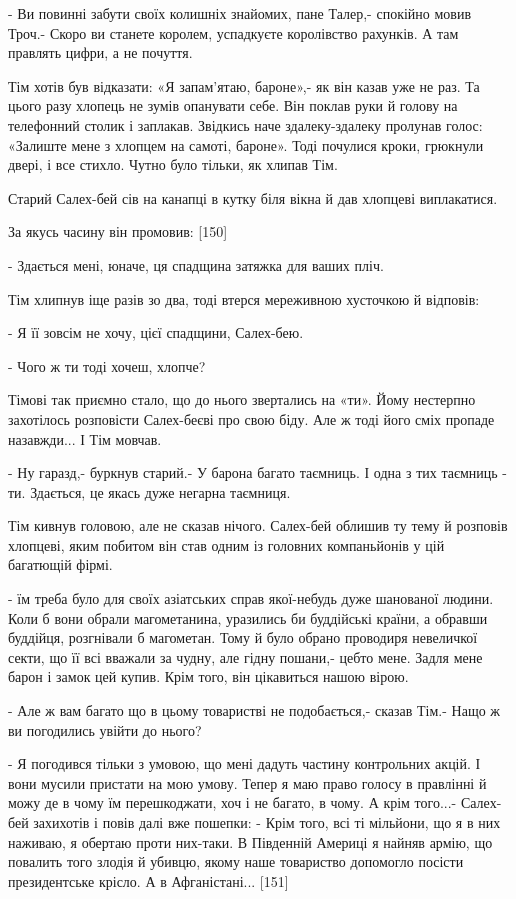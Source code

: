 - Ви повинні забути своїх колишніх знайомих, пане Талер,- спокійно мовив Троч.- Скоро ви станете королем, успадкуєте королівство рахунків. А там правлять цифри, а не почуття.

Тім хотів був відказати: «Я запам'ятаю, бароне»,- як він казав уже не раз. Та цього разу хлопець не зумів опанувати себе. Він поклав руки й голову на телефонний столик і заплакав. Звідкись наче здалеку-здалеку пролунав голос: «Залиште мене з хлопцем на самоті, бароне». Тоді почулися кроки, грюкнули двері, і все стихло. Чутно було тільки, як хлипав Тім.

Старий Салех-бей сів на канапці в кутку біля вікна й дав хлопцеві виплакатися.

За якусь часину він промовив: [150]

- Здається мені, юначе, ця спадщина затяжка для ваших пліч.

Тім хлипнув іще разів зо два, тоді втерся мереживною хусточкою й відповів:

- Я її зовсім не хочу, цієї спадщини, Салех-бею.

- Чого ж ти тоді хочеш, хлопче?

Тімові так приємно стало, що до нього звертались на «ти». Йому нестерпно захотілось розповісти Салех-беєві про свою біду. Але ж тоді його сміх пропаде назавжди... І Тім мовчав.

- Ну гаразд,- буркнув старий.- У барона багато таємниць. І одна з тих таємниць - ти. Здається, це якась дуже негарна таємниця.

Тім кивнув головою, але не сказав нічого. Салех-бей облишив ту тему й розповів хлопцеві, яким побитом він став одним із головних компаньйонів у цій багатющій фірмі.

- їм треба було для своїх азіатських справ якої-небудь дуже шанованої людини. Коли б вони обрали магометанина, уразились би буддійські країни, а обравши буддійця, розгнівали б магометан. Тому й було обрано проводиря невеличкої секти, що її всі вважали за чудну, але гідну пошани,- цебто мене. Задля мене барон і замок цей купив. Крім того, він цікавиться нашою вірою.

- Але ж вам багато що в цьому товаристві не подобається,- сказав Тім.- Нащо ж ви погодились увійти до нього?

- Я погодився тільки з умовою, що мені дадуть частину контрольних акцій. І вони мусили пристати на мою умову. Тепер я маю право голосу в правлінні й можу де в чому їм перешкоджати, хоч і не багато, в чому. А крім того...- Салех-бей захихотів і повів далі вже пошепки: - Крім того, всі ті мільйони, що я в них наживаю, я обертаю проти них-таки. В Південній Америці я найняв армію, що повалить того злодія й убивцю, якому наше товариство допомогло посісти президентське крісло. А в Афганістані... [151]

